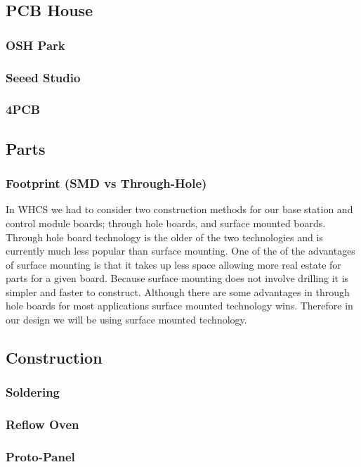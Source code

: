 \tbw

\subsection{PCB House}

\subsubsection{OSH Park}

\subsubsection{Seeed Studio}

\subsubsection{4PCB}

\subsection{Parts}

\subsubsection{Footprint (SMD vs Through-Hole)}
In WHCS we had to consider two construction methods for our base station and
control module boards; through hole boards, and surface mounted boards. Through
hole board technology is the older of the two technologies and is currently
much less popular than surface mounting. One of the of the advantages of
surface mounting is that it takes up less space allowing more real estate for
parts for a given board. Because surface mounting does not involve drilling it
is simpler and faster to construct. Although there are some advantages in
through hole boards for most applications surface mounted technology wins.
Therefore in our design we will be using surface mounted technology.

\subsection{Construction}

\subsubsection{Soldering}

\subsubsection{Reflow Oven}

\subsubsection{Proto-Panel}

